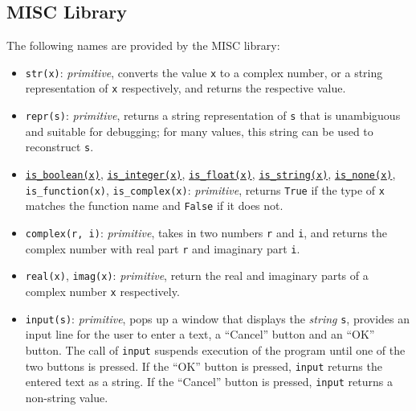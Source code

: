\subsection*{MISC Library}

The following
names are provided by the MISC library:
\begin{itemize}
  \item \verb#str#\texttt{(x)}: \textit{primitive},
    converts the value \texttt{x} to a complex number, or a string
    representation of \texttt{x} respectively, and returns the
    respective value.

  \item \verb#repr#\texttt{(s)}: \textit{primitive},
    returns a string representation of \texttt{s} that is unambiguous and suitable for
    debugging; for many values, this string can be used to reconstruct \texttt{s}.    
  \item
    \href{https://sourceacademy.org/sicpy/4.1.2\#p2}{\lstinline{is_boolean(x)}},
    \href{https://sourceacademy.org/sicpy/2.3.2\#p5}{\lstinline{is_integer(x)}},
    \href{https://sourceacademy.org/sicpy/2.3.2\#p5}{\lstinline{is_float(x)}},
    \href{https://sourceacademy.org/sicpy/2.3.2\#p7}{\lstinline{is_string(x)}},
    \href{https://sourceacademy.org/sicpy/4.1.2\#p2}{\lstinline{is_none(x)}},
    \verb#is_function#\texttt{(x)},
    \verb#is_complex#\texttt{(x)}: \textit{primitive}, returns
    \texttt{True} if the type of \texttt{x} matches the function name
    and \texttt{False} if it does not.

  \item \verb#complex#\texttt{(r, i)}: \textit{primitive},
    takes in two numbers \texttt{r} and \texttt{i}, and returns the complex number 
    with real part \texttt{r} and imaginary part \texttt{i}.

  \item \texttt{real(x)}, \texttt{imag(x)}: \textit{primitive}, return the 
    real and imaginary parts of a complex number \texttt{x} respectively.

  \item \texttt{input(s)}: \textit{primitive}, pops up a window that
    displays the \emph{string} \texttt{s}, provides
    an input line for the user to enter a text, a ``Cancel'' button
    and an ``OK'' button. The call of \texttt{input}
    suspends execution of the program until one of the two buttons is
    pressed. If
    the ``OK'' button is pressed, \texttt{input} returns the entered
    text as a string.
    If the ``Cancel'' button is pressed, \texttt{input} returns a
    non-string value.


\end{itemize}
